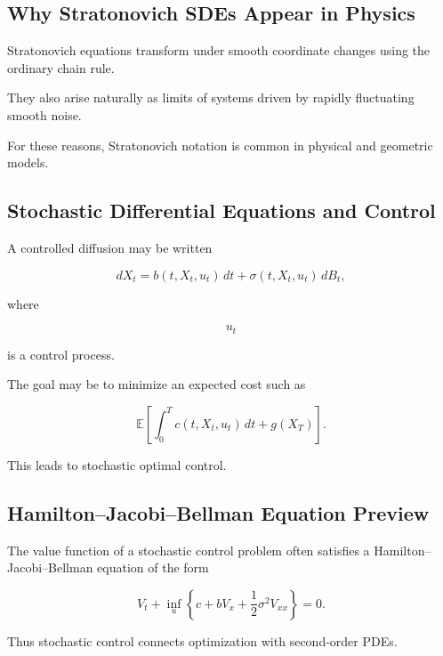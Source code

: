 \subsection{Why Stratonovich SDEs Appear in Physics}
\label{subsec:stratonovich-physics}

Stratonovich equations transform under smooth coordinate changes using
the ordinary chain rule.

They also arise naturally as limits of systems driven by rapidly
fluctuating smooth noise.

For these reasons, Stratonovich notation is common in physical and
geometric models.

\subsection{Stochastic Differential Equations and Control}
\label{subsec:sde-control}

A controlled diffusion may be written

\[
\boxed{
dX_t
=
b(t,X_t,u_t)\,dt
+
\sigma(t,X_t,u_t)\,dB_t,
}
\]

where

\[
u_t
\]

is a control process.

The goal may be to minimize an expected cost such as

\[
\boxed{
\mathbb{E}
\left[
\int_0^T
c(t,X_t,u_t)\,dt
+
g(X_T)
\right].
}
\]

This leads to stochastic optimal control.

\subsection{Hamilton--Jacobi--Bellman Equation Preview}
\label{subsec:hjb-preview}

The value function of a stochastic control problem often satisfies a
Hamilton--Jacobi--Bellman equation of the form

\[
\boxed{
V_t
+
\inf_u
\left\{
c
+
bV_x
+
\frac12\sigma^2V_{xx}
\right\}
=
0.
}
\]

Thus stochastic control connects optimization with second-order PDEs.

